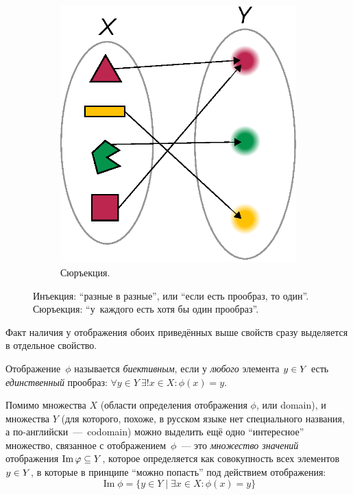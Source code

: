 \documentclass[a4paper,12pt]{article}
\DeclareMathOperator{\Imag}{Im}
\begin{document}
\begin{figure}[ht]
\begin{subfigure}[b]{0.3\textwidth}
      \centering
      \includegraphics[width=\columnwidth]{surjection}
  
      \caption{Сюръекция.}
      \label{fig:surjection}
    \end{subfigure}
    
    \caption{Инъекция: ``разные в разные'', или ``если есть прообраз, то один''. Сюръекция: ``у~каждого есть хотя бы один прообраз''.}
  \end{figure}
  
  Факт наличия у отображения обоих приведённых выше свойств сразу выделяется в отдельное свойство.
  
  \begin{definition}
    Отображение~$\phi$ называется \emph{биективным}, если у \emph{любого} элемента $y \hm\in Y$ есть \emph{единственный} прообраз:
    $
      \forall y \in Y\ \exists ! x \in X\colon \phi(x) = y
    $.
  \end{definition}
  
  Помимо множества $X$ (области определения отображения $\phi$, или domain), и множества $Y$ (для которого, похоже, в русском языке нет специального названия, а по-английски~---~codomain) можно выделить ещё одно ``интересное'' множество, связанное с отображением~$\phi$~--- это \emph{множество значений} отображения $\Imag \phi \hm\subseteq Y$, которое определяется как совокупность всех элементов $y \hm\in Y$, в которые в принципе ``можно попасть'' под действием отображения:
  \[
    \Imag \phi = \{y \in Y \mid \exists x \in X\colon \phi(x) = y\}
  \]
  
\end{document}
